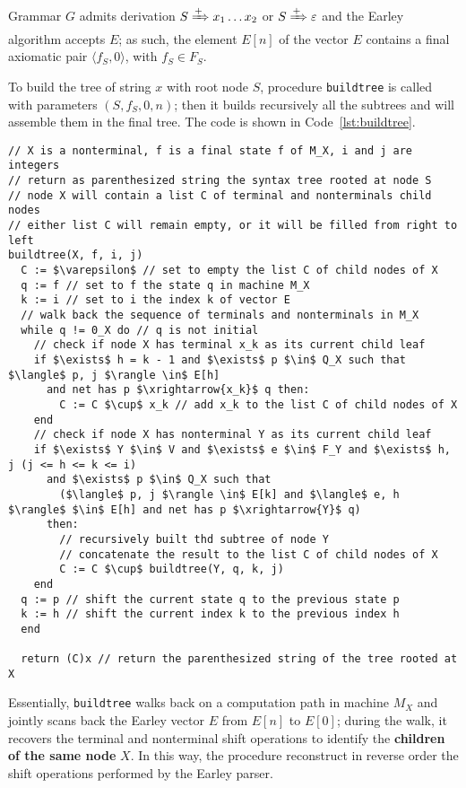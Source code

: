 \documentclass[english]{article}
\begin{document}
Grammar \(G\) admits derivation \(S \xRightarrow{+} x_1 \ldots x_2\) or \(S \xRightarrow{+} \varepsilon\) and the Earley algorithm accepts \(E\);
as such, the element \(E[n]\) of the vector \(E\) contains a final axiomatic pair \(\langle f_S, 0 \rangle\), with \(f_S \in F_S\).

To build the tree of string \(x\) with root node \(S\), procedure \texttt{buildtree} is called with parameters \((S, f_S, 0, n)\);
then it builds recursively all the subtrees and will assemble them in the final tree.
The code is shown in Code~\ref{lst:buildtree}.

\begin{lstlisting}[caption={\texttt{buildtree} procedure}, label={lst:buildtree}]
// X is a nonterminal, f is a final state f of M_X, i and j are integers
// return as parenthesized string the syntax tree rooted at node S
// node X will contain a list C of terminal and nonterminals child nodes
// either list C will remain empty, or it will be filled from right to left
buildtree(X, f, i, j)
  C := $\varepsilon$ // set to empty the list C of child nodes of X
  q := f // set to f the state q in machine M_X
  k := i // set to i the index k of vector E
  // walk back the sequence of terminals and nonterminals in M_X
  while q != 0_X do // q is not initial
    // check if node X has terminal x_k as its current child leaf
    if $\exists$ h = k - 1 and $\exists$ p $\in$ Q_X such that $\langle$ p, j $\rangle \in$ E[h]
      and net has p $\xrightarrow{x_k}$ q then:
        C := C $\cup$ x_k // add x_k to the list C of child nodes of X
    end
    // check if node X has nonterminal Y as its current child leaf
    if $\exists$ Y $\in$ V and $\exists$ e $\in$ F_Y and $\exists$ h, j (j <= h <= k <= i)
      and $\exists$ p $\in$ Q_X such that
        ($\langle$ p, j $\rangle \in$ E[k] and $\langle$ e, h $\rangle$ $\in$ E[h] and net has p $\xrightarrow{Y}$ q)
      then:
        // recursively built thd subtree of node Y
        // concatenate the result to the list C of child nodes of X
        C := C $\cup$ buildtree(Y, q, k, j)
    end
  q := p // shift the current state q to the previous state p
  k := h // shift the current index k to the previous index h
  end

  return (C)x // return the parenthesized string of the tree rooted at X
\end{lstlisting}

\bigskip
Essentially, \texttt{buildtree} walks back on a computation path in machine \(M_X\) and jointly scans back the Earley vector \(E\) from \(E[n]\) to \(E[0]\);
during the walk, it recovers the terminal and nonterminal shift operations to identify the \textbf{children of the same node} \(X\).
In this way, the procedure reconstruct in reverse order the shift operations performed by the Earley parser.
\end{document}
